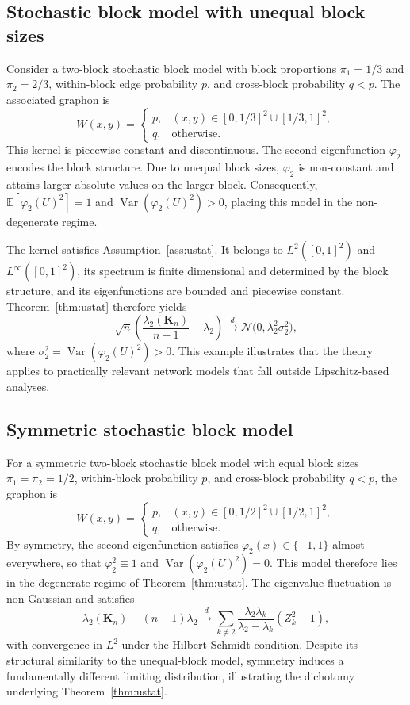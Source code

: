\documentclass[11pt]{article}
\theoremstyle{plain}
\theoremstyle{remark}
\DeclareMathOperator{\Var}{Var}
\begin{document}
\subsection{Stochastic block model with unequal block sizes}

Consider a two-block stochastic block model with block proportions $\pi_1=1/3$ and $\pi_2=2/3$, within-block edge probability $p$, and cross-block probability $q<p$. The associated graphon is
\[
W(x,y)=
\begin{cases}
p, & (x,y)\in[0,1/3]^2\cup[1/3,1]^2,\\
q, & \text{otherwise}.
\end{cases}
\]
This kernel is piecewise constant and discontinuous. The second eigenfunction $\varphi_2$ encodes the block structure. Due to unequal block sizes, $\varphi_2$ is non-constant and attains larger absolute values on the larger block. Consequently,
$\mathbb{E}[\varphi_2(U)^2]=1$ and $\Var(\varphi_2(U)^2)>0$, placing this model in the non-degenerate regime.

The kernel satisfies Assumption~\ref{ass:ustat}. It belongs to $L^2([0,1]^2)$ and $L^\infty([0,1]^2)$, its spectrum is finite dimensional and determined by the block structure, and its eigenfunctions are bounded and piecewise constant. Theorem~\ref{thm:ustat} therefore yields
\[
\sqrt{n}\left(\frac{\lambda_2(\mathbf{K}_n)}{n-1}-\lambda_2\right)
\xrightarrow{d}
\mathcal{N}\bigl(0,\lambda_2^2\sigma_2^2\bigr),
\]
where $\sigma_2^2=\Var(\varphi_2(U)^2)>0$. This example illustrates that the theory applies to practically relevant network models that fall outside Lipschitz-based analyses.

\subsection{Symmetric stochastic block model}

For a symmetric two-block stochastic block model with equal block sizes $\pi_1=\pi_2=1/2$, within-block probability $p$, and cross-block probability $q<p$, the graphon is
\[
W(x,y)=
\begin{cases}
p, & (x,y)\in[0,1/2]^2\cup[1/2,1]^2,\\
q, & \text{otherwise}.
\end{cases}
\]
By symmetry, the second eigenfunction satisfies $\varphi_2(x)\in\{-1,1\}$ almost everywhere, so that $\varphi_2^2\equiv1$ and $\Var(\varphi_2(U)^2)=0$. This model therefore lies in the degenerate regime of Theorem~\ref{thm:ustat}. The eigenvalue fluctuation is non-Gaussian and satisfies
\[
\lambda_2(\mathbf{K}_n)-(n-1)\lambda_2
\xrightarrow{d}
\sum_{k\neq2}\frac{\lambda_2\lambda_k}{\lambda_2-\lambda_k}(Z_k^2-1),
\]
with convergence in $L^2$ under the Hilbert-Schmidt condition. Despite its structural similarity to the unequal-block model, symmetry induces a fundamentally different limiting distribution, illustrating the dichotomy underlying Theorem~\ref{thm:ustat}.
\end{document}
